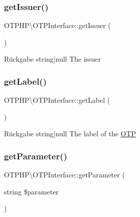 \subsubsection{\texorpdfstring{get\+Issuer()}{getIssuer()}}
{\footnotesize\ttfamily O\+T\+P\+H\+P\textbackslash{}\+O\+T\+P\+Interface\+::get\+Issuer (\begin{DoxyParamCaption}{ }\end{DoxyParamCaption})}

\begin{DoxyReturn}{Rückgabe}
string$\vert$null The issuer 
\end{DoxyReturn}
\mbox{\label{interface_o_t_p_h_p_1_1_o_t_p_interface_a6e678de1987420ba53f9a35e36828a8a}} 
\subsubsection{\texorpdfstring{get\+Label()}{getLabel()}}
{\footnotesize\ttfamily O\+T\+P\+H\+P\textbackslash{}\+O\+T\+P\+Interface\+::get\+Label (\begin{DoxyParamCaption}{ }\end{DoxyParamCaption})}

\begin{DoxyReturn}{Rückgabe}
string$\vert$null The label of the \mbox{\hyperlink{class_o_t_p_h_p_1_1_o_t_p}{O\+TP}} 
\end{DoxyReturn}
\mbox{\label{interface_o_t_p_h_p_1_1_o_t_p_interface_ade4b3c7737dea6a60bf81bfb4df6c6da}} 
\subsubsection{\texorpdfstring{get\+Parameter()}{getParameter()}}
{\footnotesize\ttfamily O\+T\+P\+H\+P\textbackslash{}\+O\+T\+P\+Interface\+::get\+Parameter (\begin{DoxyParamCaption}\item[{string}]{\$parameter }\end{DoxyParamCaption})}


